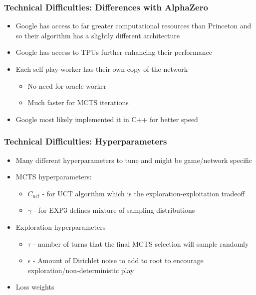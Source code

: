 \documentclass{beamer}
\begin{document}
\begin{frame}
  \frametitle{Technical Difficulties: Differences with AlphaZero}

  \begin{itemize}
    \item Google has access to far greater computational resources than Princeton and so their algorithm has a slightly different architecture
    \item Google has access to TPUs further enhancing their performance
    \item Each self play worker has their own copy of the network
      \begin{itemize}
        \item No need for oracle worker
        \item Much faster for MCTS iterations
      \end{itemize}
    \item Google most likely implemented it in C++ for better speed
  \end{itemize}
\end{frame}



\begin{frame}
  \frametitle{Technical Difficulties: Hyperparameters}

  \begin{itemize}
    \item Many different hyperparameters to tune and might be game/network specific
    \item MCTS hyperparameters:
      \begin{itemize}
        \item $C_{uct}$ - for UCT algorithm which is the exploration-exploitation tradeoff
        \item $\gamma$ - for EXP3 defines mixture of sampling distributions
      \end{itemize}
    \item Exploration hyperparameters
      \begin{itemize}
        \item $\tau$ - number of turns that the final MCTS selection will sample randomly 
        \item $\epsilon$ - Amount of Dirichlet noise to add to root to encourage exploration/non-deterministic play
      \end{itemize}
    \item Loss weights
  \end{itemize}
\end{frame}
\end{document}
